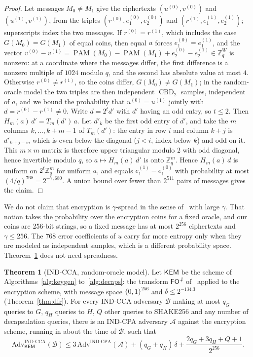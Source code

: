 \documentclass[11pt,a4paper]{article}
\theoremstyle{definition}
\newtheorem{theorem}{Theorem}
\newcommand{\Zq}{\mathbb{Z}_q}
\newcommand{\CBD}{\operatorname{CBD}}
\newcommand{\PAM}{\operatorname{PAM}}
\begin{document}
\begin{proof}
Let messages $M_0 \ne M_1$ give the ciphertexts $(u^{(0)}, v^{(0)})$ and $(u^{(1)}, v^{(1)})$, from the triples $(r^{(0)}, e_1^{(0)}, e_2^{(0)})$ and $(r^{(1)}, e_1^{(1)}, e_2^{(1)})$; superscripts index the two messages. If $r^{(0)} = r^{(1)}$, which includes the case $G(M_0) = G(M_1)$ of equal coins, then equal $u$ forces $e_1^{(0)} = e_1^{(1)}$, and the vector $v^{(0)} - v^{(1)} = \PAM(M_0) - \PAM(M_1) + e_2^{(0)} - e_2^{(1)} \in \Zq^W$ is nonzero: at a coordinate where the messages differ, the first difference is a nonzero multiple of $1024$ modulo $q$, and the second has absolute value at most $4$. Otherwise $r^{(0)} \ne r^{(1)}$, so the coins differ, $G(M_0) \ne G(M_1)$; in the random-oracle model the two triples are then independent $\CBD_2$ samples, independent of $a$, and we bound the probability that $u^{(0)} = u^{(1)}$ jointly with $d = r^{(0)} - r^{(1)} \ne 0$. Write $d = 2^t d'$ with $d'$ having an odd entry, so $t \le 2$. Then $H_m(a)\,d' = T_m(d')\,a$. Let $d'_k$ be the first odd entry of $d'$, and take the $m$ columns $k, \dots, k + m - 1$ of $T_m(d')$: the entry in row $i$ and column $k + j$ is $d'_{k+j-i}$, which is even below the diagonal ($j < i$, index below $k$) and odd on it. This $m \times m$ matrix is therefore upper triangular modulo $2$ with odd diagonal, hence invertible modulo $q$, so $a \mapsto H_m(a)\,d'$ is onto $\Zq^m$. Hence $H_m(a)\,d$ is uniform on $2^t\Zq^m$ for uniform $a$, and equals $e_1^{(1)} - e_1^{(0)}$ with probability at most $(4/q)^{768} = 2^{-7{,}680}$. A union bound over fewer than $2^{511}$ pairs of messages gives the claim.
\end{proof}

We do not claim that encryption is $\gamma$-spread in the sense of~\cite{hhk2017modular} with large $\gamma$. That notion takes the probability over the encryption coins for a fixed oracle, and our coins are 256-bit strings, so a fixed message has at most $2^{256}$ ciphertexts and $\gamma \le 256$. The $768$ error coefficients of $u$ carry far more entropy only when they are modeled as independent samples, which is a different probability space. Theorem~\ref{thm:cca} does not need spreadness.

\begin{theorem}[IND-CCA, random-oracle model]\label{thm:cca}
Let $\mathsf{KEM}$ be the scheme of Algorithms~\ref{alg:keygen} to~\ref{alg:decaps}: the transform $\mathsf{FO}^{\not\perp}$ of~\cite{hhk2017modular} applied to the encryption scheme, with message space $\{0,1\}^{256}$ and $\delta \le 2^{-134.3}$ (Theorem~\ref{thm:dfr}). For every IND-CCA adversary $\mathcal{B}$ making at most $q_G$ queries to $G$, $q_H$ queries to $H$, $Q$ other queries to SHAKE256 and any number of decapsulation queries, there is an IND-CPA adversary $\mathcal{A}$ against the encryption scheme, running in about the time of $\mathcal{B}$, such that
\[
\mathrm{Adv}^{\mathrm{IND\text{-}CCA}}_{\mathsf{KEM}}(\mathcal{B}) \le 3\,\mathrm{Adv}^{\mathrm{IND\text{-}CPA}}(\mathcal{A}) + (q_G + q_H)\,\delta + \frac{2q_G + 3q_H + Q + 1}{2^{256}}.
\]
\end{theorem}
\end{document}
